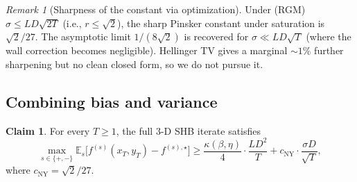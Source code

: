 \documentclass[11pt]{article}
\theoremstyle{definition}
\newtheorem{claim}[theorem]{Claim}
\theoremstyle{remark}
\newtheorem{remark}[theorem]{Remark}
\begin{document}
\begin{remark}[Sharpness of the constant via optimization]
Under (RGM) $\sigma \leq LD\sqrt{2T}$ (i.e., $r \leq \sqrt 2$), the sharp Pinsker constant under saturation is $\sqrt 2/27$. The asymptotic limit $1/(8\sqrt 2)$ is recovered for $\sigma \ll LD\sqrt T$ (where the wall correction becomes negligible). Hellinger TV gives a marginal $\sim 1\%$ further sharpening but no clean closed form, so we do not pursue it.
\end{remark}

\subsection{Combining bias and variance}

\begin{claim}
\label{cl:combined}
For every $T \geq 1$, the full 3-D SHB iterate satisfies
\[
  \max_{s \in \{+, -\}} \mathbb{E}_s\big[f^{(s)}(x_T, y_T) - f^{(s),\star}\big] \geq \frac{\kappa(\beta,\eta)}{4}\cdot \frac{L D^2}{T} + c_{\mathrm{NY}}\cdot \frac{\sigma D}{\sqrt T},
\]
where $c_{\mathrm{NY}} = \sqrt 2/27$.
\end{claim}
\end{document}
